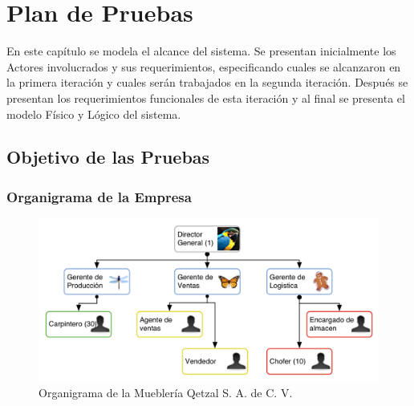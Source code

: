 \chapter{Plan de Pruebas}
\label{cap:reqUsr}

	En este capítulo se modela el alcance del sistema. Se presentan inicialmente los Actores involucrados y sus requerimientos, especificando cuales se alcanzaron en la primera iteración y cuales serán trabajados en la segunda iteración. Después se presentan los requerimientos funcionales de esta iteración y al final se presenta el modelo Físico y Lógico del sistema.


\section{Objetivo de las Pruebas}

\subsection{Organigrama de la Empresa}
\begin{figure}[htbp]
	\begin{center}
		\includegraphics[width=.8\textwidth]{images/organigramaEm}
		\caption{Organigrama de la Mueblería Qetzal S. A. de C. V.}
		\label{fig:organigrama}
	\end{center}
\end{figure}


